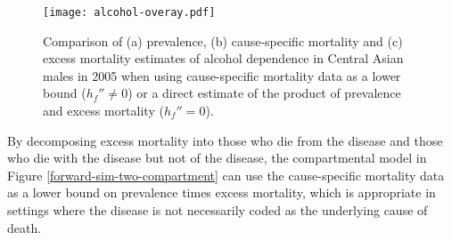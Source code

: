     \begin{figure}[h]
        \begin{center}
            \texttt{[image: alcohol-overay.pdf]}
            \caption{Comparison of (a) prevalence,
              (b) cause-specific mortality and (c) excess
              mortality estimates of alcohol
              dependence in Central Asian males in 2005 when using
              cause-specific mortality data as a lower bound ($h_f'' \neq 0$)
              or a direct estimate of the product of
              prevalence and excess mortality ($h_f'' = 0$).}
            \label{fig:app-alcohol compare}
        \end{center}
    \end{figure}

By decomposing excess mortality into those who die from the
disease and those who die with the disease but not of the disease, the
compartmental model in Figure \ref{forward-sim-two-compartment} can
use the cause-specific mortality data as a lower bound on prevalence
times excess mortality, which is appropriate in settings where the
disease is not necessarily coded as the underlying cause of death.
